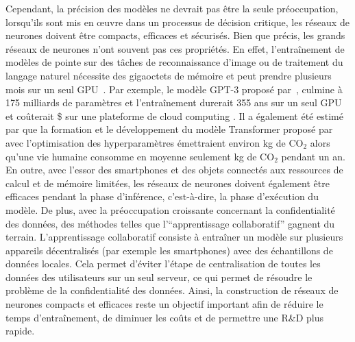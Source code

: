 Cependant, la précision des modèles ne devrait pas être la seule préoccupation, lorsqu'ils sont mis en œuvre dans un processus de décision critique, les réseaux de neurones doivent être compacts, efficaces et sécurisés.
Bien que précis, les grands réseaux de neurones n'ont souvent pas ces propriétés.
En effet, l'entraînement de modèles de pointe sur des tâches de reconnaissance d'image ou de traitement du langage naturel nécessite des gigaoctets de mémoire et peut prendre plusieurs mois sur un seul GPU~\cite{krizhevsky2012imagenet,brown2020language}.
Par exemple, le modèle GPT-3 proposé par~\citet{brown2020language}, culmine à 175 milliards de paramètres et l'entraînement durerait 355 ans sur un seul GPU et coûterait \$ sur une plateforme de cloud computing \cite{li2020overview}.
Il a également été estimé par \citet{strubell2019energy} que la formation et le développement du modèle Transformer proposé par~\citet{vaswani2017attention} avec l'optimisation des hyperparamètres émettraient environ  kg de $\mathrm{CO}_2$ alors qu'une vie humaine consomme en moyenne seulement  kg de $\mathrm{CO}_2$ pendant un an. 
En outre, avec l'essor des smartphones et des objets connectés aux ressources de calcul et de mémoire limitées, les réseaux de neurones doivent également être efficaces pendant la phase d'inférence, c'est-à-dire, la phase d'exécution du modèle.
De plus, avec la préoccupation croissante concernant la confidentialité des données, des méthodes telles que l'``apprentissage collaboratif'' gagnent du terrain.
L'apprentissage collaboratif consiste à entraîner un modèle sur plusieurs appareils décentralisés (par exemple les smartphones) avec des échantillons de données locales.
Cela permet d'éviter l'étape de centralisation de toutes les données des utilisateurs sur un seul serveur, ce qui permet de résoudre le problème de la confidentialité des données.
Ainsi, la construction de réseaux de neurones compacts et efficaces reste un objectif important afin de réduire le temps d'entraînement, de diminuer les coûts et de permettre une R\&D plus rapide.





